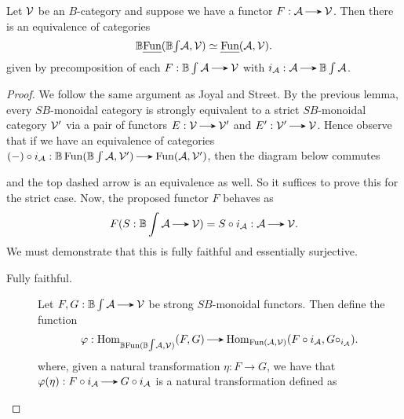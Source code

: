 \begin{theorem}
    Let $\mathcal{V}$ be an $B$-category and suppose we have a functor $F: \aa \to \vv$. Then there is an equivalence of categories 
    \[
       \mathbb{B}\text{\emph{Fun}}(\mathbb{B}{\textstyle\int}\mathcal{A}, \mathcal{V}) \simeq \text{\emph{Fun}}(\mathcal{A}, \mathcal{V}).
    \]
    given by precomposition of each $F: \mathbb{B}\int\aa \to \vv$ with $i_{\aa}: \aa \to \mathbb{B}\int\aa$.
\end{theorem}

\begin{proof}
    We follow the same argument as Joyal and Street. By the previous lemma, every $SB$-monoidal category is strongly equivalent to a strict $SB$-monoidal category $\mathcal{V}'$ via a pair of functors $E: \vv \to \vv'$ and $E': \vv' \to \vv$. Hence observe that if we have an equivalence of categories $(-) \circ i_{\aa}: \mathbb{B}\fun(\mathbb{B}\int\aa, \vv') \to \fun(\aa, \vv')$, then the diagram below commutes
     \begin{center}
     \end{center}
    and the top dashed arrow is an equivalence as well.
    So it suffices to prove this for the strict case. 
    Now, the proposed functor $F$ behaves as 
    \[
        F(S: \mathbb{B}\int\aa \to \vv) = S \circ i_{\aa}: \aa \to \vv.
    \]
    We must demonstrate that this is fully faithful and essentially surjective.
    \begin{description}
        \item[Fully faithful.]
        Let $F, G: \mathbb{B}\int\aa \to \vv$ be strong $SB$-monoidal functors. Then define the function
        \[
            \phi: \hom_{\mathbb{B}\text{Fun}(\mathbb{B}{\textstyle\int}\aa, \vv)}(F,G)
            \to 
            \hom_{\text{Fun}(\aa, \vv)}(F \circ i_{\aa}, 
            G\circ_{i_{\aa}}).
        \]
        where, given a natural transformation $\eta: F \to G$,
        we have that $\phi(\eta): F\circ i_{\aa} \to G \circ i_{\aa}$ is a natural transformation defined as 

\end{description}
\end{proof}
